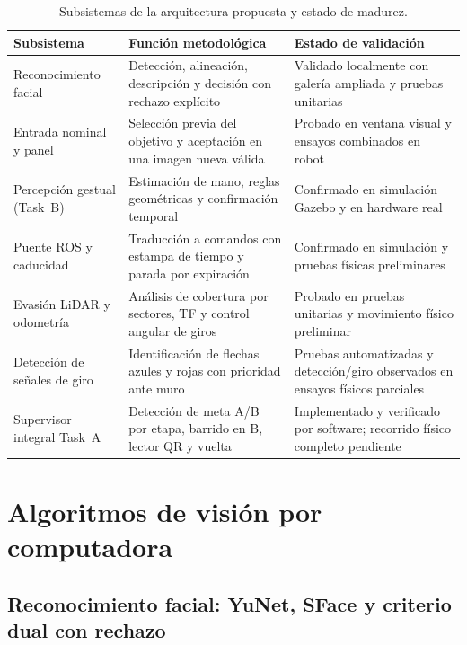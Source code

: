 \documentclass[11pt,a4paper]{article}
\begin{document}
\begin{table}[htbp]
  \centering
  \small
  \begin{tabularx}{\textwidth}{@{}P{4.2cm}P{5.4cm}Y@{}}
    \hline
    \textbf{Subsistema} & \textbf{Función metodológica} & \textbf{Estado de validación}\\
    \hline
    Reconocimiento facial &
    Detección, alineación, descripción y decisión con rechazo explícito &
    Validado localmente con galería ampliada y pruebas unitarias\\
    Entrada nominal y panel &
    Selección previa del objetivo y aceptación en una imagen nueva válida &
    Probado en ventana visual y ensayos combinados en robot\\
    Percepción gestual (Task~B) &
    Estimación de mano, reglas geométricas y confirmación temporal &
    Confirmado en simulación Gazebo y en hardware real\\
    Puente ROS y caducidad &
    Traducción a comandos con estampa de tiempo y parada por expiración &
    Confirmado en simulación y pruebas físicas preliminares\\
    Evasión LiDAR y odometría &
    Análisis de cobertura por sectores, TF y control angular de giros &
    Probado en pruebas unitarias y movimiento físico preliminar\\
    Detección de señales de giro &
    Identificación de flechas azules y rojas con prioridad ante muro &
    Pruebas automatizadas y detección/giro observados en ensayos físicos parciales\\
    Supervisor integral Task~A &
    Detección de meta A/B por etapa, barrido en B, lector QR y vuelta &
    Implementado y verificado por software; recorrido físico completo pendiente\\
    \hline
  \end{tabularx}
  \caption{Subsistemas de la arquitectura propuesta y estado de madurez.}
  \label{tab:componentes}
\end{table}

\section{Algoritmos de visión por computadora}

\subsection{Reconocimiento facial: YuNet, SFace y criterio dual con rechazo}
\label{sec:algoritmo_facial}
\end{document}
